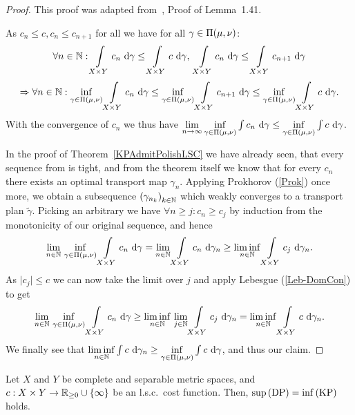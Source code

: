 \begin{proof}
	This proof was adapted from~\cite{San2015}, Proof of Lemma~1.41.

	As $c_n \le c, c_n \le c_{n + 1}$ for all \NinN{} we have for all $\gamma \in \TP{\mu}{\nu}$:
	\[ \forall \NinN: \int\limits_{X \times Y} c_n~\D[\gamma] \le \int\limits_{X \times Y} c~\D[\gamma],\ \int\limits_{X \times Y} c_n~\D[\gamma] \le \int\limits_{X \times Y} c_{n + 1}~\D[\gamma] \]
	\[ \Rightarrow \forall \NinN: \inf\limits_{\gamma \in \TP{\mu}{\nu}} \int\limits_{X \times Y} c_n~\D[\gamma] \le \inf\limits_{\gamma \in \TP{\mu}{\nu}} \int\limits_{X \times Y} c_{n + 1}~\D[\gamma] \le \inf\limits_{\gamma \in \TP{\mu}{\nu}} \int\limits_{X \times Y} c~\D[\gamma]. \]
	With the convergence of $c_n$ we thus have $\lim\limits_{\Ninf} \inf\limits_{\gamma \in \TP{\mu}{\nu}} \int c_n~\D[\gamma] \le \inf\limits_{\gamma \in \TP{\mu}{\nu}} \int c~\D[\gamma]$.

	In the proof of Theorem~\ref{KPAdmitPolishLSC} we have already seen, that every sequence from \TP{\mu}{\nu} is tight, and from the theorem itself we know that for every $c_n$ there exists an optimal transport map $\gamma_n$. Applying Prokhorov (\ref{Prok}) once more, we obtain a subsequence ${(\gamma_{n_k})}_{\NinN[k]}$ which weakly converges to a transport plan $\tilde{\gamma}$. Picking an arbitrary \NinN[j] we have $\forall n \ge j: c_n \ge c_j$ by induction from the monotonicity of our original sequence, and hence
	\[ \lim\limits_{\NinN}\,\inf\limits_{\gamma \in \TP{\mu}{\nu}} \int\limits_{X \times Y} c_n~\D[\gamma] = \lim\limits_{\NinN} \int\limits_{X \times Y} c_n~\D[\gamma_n] \ge \liminf\limits_{\NinN} \int\limits_{X \times Y} c_j~\D[\gamma_n]. \]
	As $\vert c_j \vert \le c$ we can now take the limit over $j$ and apply Lebesgue (\ref{Leb-DomCon}) to get
	\[ \lim\limits_{\NinN}\,\inf\limits_{\gamma \in \TP{\mu}{\nu}} \int\limits_{X \times Y} c_n~\D[\gamma] \ge \liminf\limits_{\NinN}\,\lim\limits_{\NinN[j]} \int\limits_{X \times Y} c_j~\D[\gamma_n] = \liminf\limits_{\NinN} \int\limits_{X \times Y} c~\D[\gamma_n]. \]
	We finally see that $\liminf\limits_{\NinN} \int c~\D[\gamma_n] \ge \inf\limits_{\gamma \in \TP{\mu}{\nu}} \int c~\D[\gamma]$, and thus our claim.
\end{proof}

\begin{theorem}\label{GenPDRel}
	Let $X$ and $Y$ be complete and separable metric spaces, and $\map[c]{X \times Y}{\RZero \cup \{ \infty \}}$ be an l.s.c.\ cost function. Then, $\sup\!\text{\normalfont\,(DP)} = \inf\!\text{\normalfont\,(KP)}$ holds.
\end{theorem}

